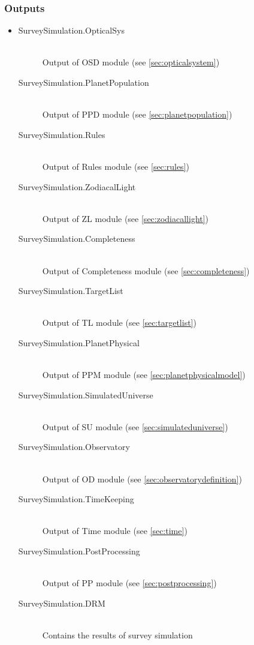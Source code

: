 \documentclass[cleanfoot]{asme2ej}
\begin{document}
\subsubsection*{Outputs}
\begin{itemize}
    \item
    \begin{description}
        \item[SurveySimulation.OpticalSys] \hfill \\
        Output of OSD module (see \ref{sec:opticalsystem})
        \item[SurveySimulation.PlanetPopulation] \hfill \\
        Output of PPD module (see \ref{sec:planetpopulation})
        \item[SurveySimulation.Rules] \hfill \\
        Output of Rules module (see \ref{sec:rules})
        \item[SurveySimulation.ZodiacalLight] \hfill \\
        Output of ZL module (see \ref{sec:zodiacallight})
        \item[SurveySimulation.Completeness] \hfill \\
        Output of Completeness module (see \ref{sec:completeness})
        \item[SurveySimulation.TargetList] \hfill \\
        Output of TL module (see \ref{sec:targetlist})
        \item[SurveySimulation.PlanetPhysical] \hfill \\
        Output of PPM module (see \ref{sec:planetphysicalmodel})
        \item[SurveySimulation.SimulatedUniverse] \hfill \\
        Output of SU module (see \ref{sec:simulateduniverse})
        \item[SurveySimulation.Observatory] \hfill \\
        Output of OD module (see \ref{sec:observatorydefinition})
        \item[SurveySimulation.TimeKeeping] \hfill \\
        Output of Time module (see \ref{sec:time})
        \item[SurveySimulation.PostProcessing] \hfill \\
        Output of PP module (see \ref{sec:postprocessing})
        \item[SurveySimulation.DRM] \hfill \\
        Contains the results of survey simulation
    \end{description}
\end{itemize}
\end{document}
